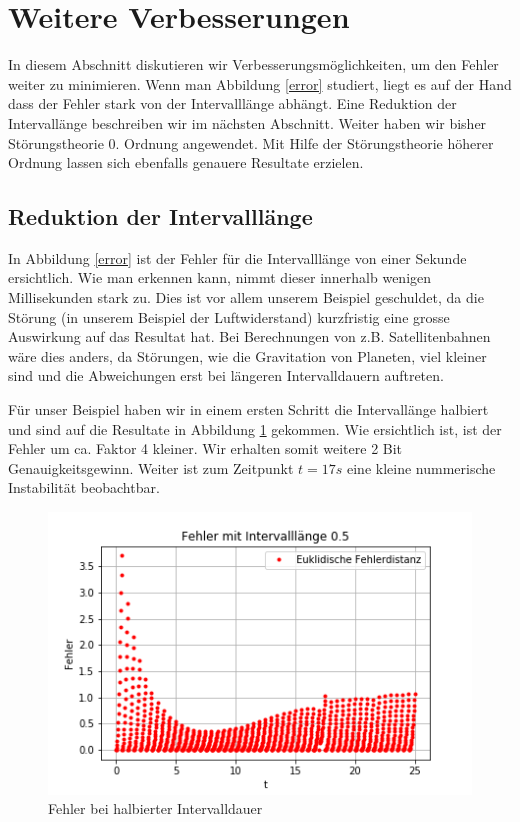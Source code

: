 \section{Weitere Verbesserungen
\label{perturbation:section:weitereverbesserungen}}
In diesem Abschnitt diskutieren wir Verbesserungsmöglichkeiten, um den Fehler weiter zu minimieren. 
Wenn man Abbildung \ref{error} studiert, liegt es auf der Hand dass der Fehler stark von der Intervalllänge abhängt. 
Eine Reduktion der Intervallänge beschreiben wir im nächsten Abschnitt. 
Weiter haben wir bisher Störungstheorie 0. Ordnung angewendet. 
Mit Hilfe der Störungstheorie höherer Ordnung lassen sich ebenfalls genauere Resultate erzielen.


\subsection{Reduktion der Intervalllänge}
In Abbildung \ref{error} ist der Fehler für die Intervalllänge von einer Sekunde ersichtlich. 
Wie man erkennen kann, nimmt dieser innerhalb wenigen Millisekunden stark zu. 
Dies ist vor allem unserem Beispiel geschuldet, da die Störung (in unserem Beispiel der Luftwiderstand) kurzfristig eine grosse Auswirkung auf das Resultat hat. 
Bei Berechnungen von z.B. Satellitenbahnen wäre dies anders, da Störungen, wie die Gravitation von Planeten, viel kleiner sind und die Abweichungen erst bei längeren Intervalldauern auftreten.

Für unser Beispiel haben wir in einem ersten Schritt die Intervallänge halbiert und sind auf die Resultate in Abbildung \ref{errorShortInterval} gekommen. 
Wie ersichtlich ist, ist der Fehler um ca. Faktor 4 kleiner. 
Wir erhalten somit weitere 2 Bit Genauigkeitsgewinn. 
Weiter ist zum Zeitpunkt $t=17s$ eine kleine nummerische Instabilität beobachtbar.

\begin{figure}
    \centering
    \includegraphics[scale=0.7]{papers/perturbation/bilder/halberintervall.png}
    \caption{Fehler bei halbierter Intervalldauer}
	\label{errorShortInterval}
\end{figure}

